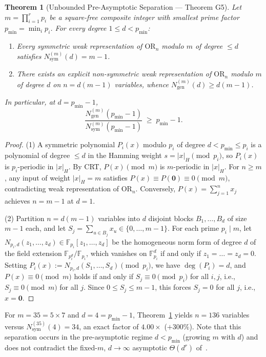 \documentclass[11pt,a4paper]{article}
\newtheorem{theorem}{Theorem}[section]
\theoremstyle{definition}
\newcommand{\F}{\mathbb{F}}
\newcommand{\OR}{\mathrm{OR}}
\newcommand{\Nsym}{N_{\mathrm{sym}}}
\newcommand{\Ngen}{N_{\mathrm{gen}}}
\begin{document}
\begin{theorem}[Unbounded Pre-Asymptotic Separation --- Theorem G5]
\label{thm:g5}
Let $m = \prod_{i=1}^r p_i$ be a square-free composite integer with smallest prime factor $p_{\min} = \min_i p_i$. For every degree $1 \le d < p_{\min}$:
\begin{enumerate}[leftmargin=*,nosep]
  \item Every symmetric weak representation of $\OR_n$ modulo $m$ of degree $\le d$ satisfies $\Nsym^{(m)}(d) = m - 1$.
  \item There exists an explicit non-symmetric weak representation of $\OR_n$ modulo $m$ of degree $d$ on $n = d(m-1)$ variables, whence $\Ngen^{(m)}(d) \ge d(m-1)$.
\end{enumerate}
In particular, at $d = p_{\min} - 1$,
\[
  \frac{\Ngen^{(m)}(p_{\min} - 1)}{\Nsym^{(m)}(p_{\min} - 1)} \;\ge\; p_{\min} - 1.
\]
\end{theorem}

\begin{proof}
(1) A symmetric polynomial $P_i(x)$ modulo $p_i$ of degree $d < p_{\min} \le p_i$ is a polynomial of degree $\le d$ in the Hamming weight $s = |x|_H \pmod{p_i}$, so $P_i(x)$ is $p_i$-periodic in $|x|_H$. By CRT, $P(x) \pmod m$ is $m$-periodic in $|x|_H$. For $n \ge m$, any input of weight $|x|_H = m$ satisfies $P(x) \equiv P(\mathbf{0}) \equiv 0 \pmod m$, contradicting weak representation of $\OR_n$. Conversely, $P(x) = \sum_{j=1}^n x_j$ achieves $n = m - 1$ at $d = 1$.

(2) Partition $n = d(m-1)$ variables into $d$ disjoint blocks $B_1,\dots,B_d$ of size $m - 1$ each, and let $S_j = \sum_{u \in B_j} x_u \in \{0,\dots,m-1\}$. For each prime $p_i \mid m$, let $N_{p_i,d}(z_1,\dots,z_d) \in \F_{p_i}[z_1,\dots,z_d]$ be the homogeneous norm form of degree $d$ of the field extension $\F_{p_i^d}/\F_{p_i}$, which vanishes on $\F_{p_i}^d$ if and only if $z_1 = \dots = z_d = 0$. Setting $P_i(x) := N_{p_i,d}(S_1,\dots,S_d) \pmod{p_i}$, we have $\deg(P_i) = d$, and $P(x) \equiv 0 \pmod m$ holds if and only if $S_j \equiv 0 \pmod{p_i}$ for all $i,j$, i.e., $S_j \equiv 0 \pmod m$ for all $j$. Since $0 \le S_j \le m - 1$, this forces $S_j = 0$ for all $j$, i.e., $x = \mathbf{0}$.
\end{proof}

For $m = 35 = 5 \times 7$ and $d = 4 = p_{\min} - 1$, Theorem~\ref{thm:g5} yields $n = 136$ variables versus $\Nsym^{(35)}(4) = 34$, an exact factor of $4.00\times$ ($+300\%$). Note that this separation occurs in the pre-asymptotic regime $d < p_{\min}$ (growing $m$ with $d$) and does not contradict the fixed-$m$, $d \to \infty$ asymptotic $\Theta(d^r)$ of~\cite{BBR94}.
\end{document}
